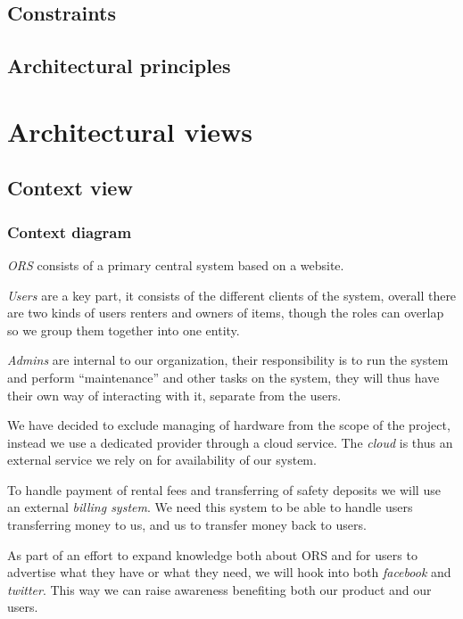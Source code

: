 \documentclass[a4paper,11pt]{report}
\begin{document}
\section{Constraints}
\label{sec:constraints}

\section{Architectural principles}
\label{sec:arch-princ}


\chapter{Architectural views}
\label{cha:architectural-views}
\thispagestyle{fancy}

\section{Context view}
\label{sec:context-view}



\subsection{Context diagram}
\label{sec:context-diagram}

\textit{ORS} consists of a primary central system based on a website.

\textit{Users} are a key part, it consists of the different clients of the
system, overall there are two kinds of users renters and owners of items, though
the roles can overlap so we group them together into one entity.

\textit{Admins} are internal to our organization, their responsibility is to run
the system and perform ``maintenance'' and other tasks on the system, they will
thus have their own way of interacting with it, separate from the users.

We have decided to exclude managing of hardware from the scope of the project,
instead we use a dedicated provider through a cloud service.
The \textit{cloud} is thus an external service we rely on for availability of
our system.

To handle payment of rental fees and transferring of safety deposits we will
use an external \textit{billing system}. We need this system to be able to
handle users transferring money to us, and us to transfer money back to users.

As part of an effort to expand knowledge both about ORS and for users to
advertise what they have or what they need, we will hook into both
\textit{facebook} and \textit{twitter}. This way we can raise awareness
benefiting both our product and our users.
\end{document}
